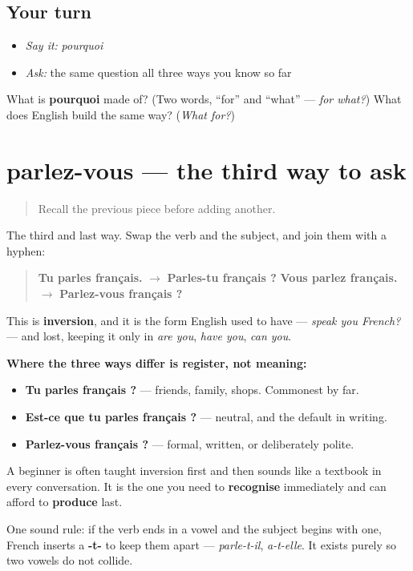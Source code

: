 \subsection*{Your turn}
\begin{itemize}
\raggedright
  \item \emph{Say it:} \emph{pourquoi}
  \item \emph{Ask:} the same question all three ways you know so far
\end{itemize}

\begin{tcolorbox}[breakable,colback=teal!4,colframe=teal!35!black,title={Before you move on}]
What is \textbf{pourquoi} made of? (Two words, \textquotedblleft{}for\textquotedblright{} and \textquotedblleft{}what\textquotedblright{} — \emph{for what?}) What does English build the same way? (\emph{What for?})
\end{tcolorbox}
\section[parlez-vous]{parlez-vous — the third way to ask}

\label{lesson:FR-C32-inversion}



\begin{quote}
Recall the previous piece before adding another.
\end{quote}

\begin{cousinweb}
The third and last way. Swap the verb and the subject, and join them with a hyphen:

\begin{quote}
\textbf{Tu parles français.} $\to$ \textbf{Parles-tu français ?} \textbf{Vous parlez français.} $\to$ \textbf{Parlez-vous français ?}
\end{quote}

This is \textbf{inversion}, and it is the form English used to have — \emph{speak you French?} — and lost, keeping it only in \emph{are you}, \emph{have you}, \emph{can you}.

\textbf{Where the three ways differ is register, not meaning:}

\begin{itemize}
\raggedright
  \item \textbf{Tu parles français ?} — friends, family, shops. Commonest by far.
  \item \textbf{Est-ce que tu parles français ?} — neutral, and the default in writing.
  \item \textbf{Parlez-vous français ?} — formal, written, or deliberately polite.
\end{itemize}

A beginner is often taught inversion first and then sounds like a textbook in every conversation. It is the one you need to \textbf{recognise} immediately and can afford to \textbf{produce} last.

One sound rule: if the verb ends in a vowel and the subject begins with one, French inserts a \textbf{-t-} to keep them apart — \emph{parle-t-il}, \emph{a-t-elle}. It exists purely so two vowels do not collide.
\end{cousinweb}

